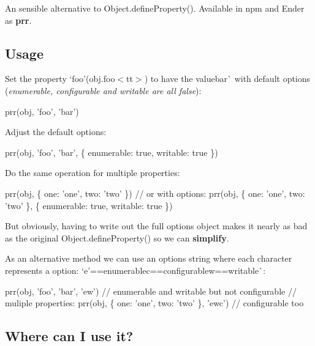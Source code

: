 An sensible alternative to {\ttfamily Object.\+define\+Property()}. Available in npm and Ender as {\bfseries prr}.

\subsection*{Usage}

Set the property `\textquotesingle{}foo'{\ttfamily (}obj.\+foo$<$tt$>$) to have the value\textquotesingle{}bar\textquotesingle{}\`{} with default options ({\itshape enumerable, configurable and writable are all false})\+:


\begin{DoxyCode}
prr(obj, 'foo', 'bar')
\end{DoxyCode}


Adjust the default options\+:


\begin{DoxyCode}
prr(obj, 'foo', 'bar', \{ enumerable: true, writable: true \})
\end{DoxyCode}


Do the same operation for multiple properties\+:


\begin{DoxyCode}
prr(obj, \{ one: 'one', two: 'two' \})
// or with options:
prr(obj, \{ one: 'one', two: 'two' \}, \{ enumerable: true, writable: true \})
\end{DoxyCode}


But obviously, having to write out the full options object makes it nearly as bad as the original {\ttfamily Object.\+define\+Property()} so we can {\bfseries simplify}.

As an alternative method we can use an options string where each character represents a option\+: `\textquotesingle{}e'==\textquotesingle{}enumerable\textquotesingle{}{\ttfamily ,}\textquotesingle{}c\textquotesingle{}==\textquotesingle{}configurable\textquotesingle{}w\textquotesingle{}==\textquotesingle{}writable\textquotesingle{}\`{}\+:


\begin{DoxyCode}
prr(obj, 'foo', 'bar', 'ew') // enumerable and writable but not configurable
// muliple properties:
prr(obj, \{ one: 'one', two: 'two' \}, 'ewc') // configurable too
\end{DoxyCode}


\subsection*{Where can I use it?}

